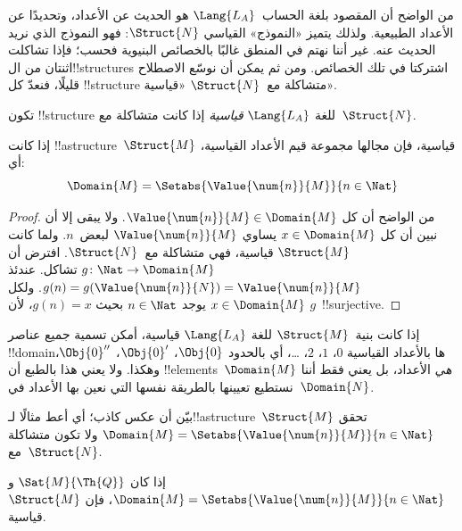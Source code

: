 \documentclass[../../../include/open-logic-section]{subfiles}
\begin{document}

من الواضح أن المقصود بلغة الحساب~$\Lang{L_A}$ هو الحديث عن الأعداد،
وتحديدًا عن الأعداد الطبيعية. ولذلك يتميز «النموذج» القياسي
$\Struct{N}$: فهو النموذج الذي نريد الحديث عنه. غير أننا نهتم في المنطق
غالبًا بالخصائص البنيوية فحسب؛ فإذا تشاكلت اثنتان من ال!!{structure}s
اشتركتا في تلك الخصائص. ومن ثم يمكن أن نوسّع الاصطلاح قليلًا، فنعدّ كل
!!{structure} متشاكلة مع~$\Struct{N}$ «قياسية».

\begin{defn}
تكون !!{structure} للغة $\Lang{L_A}$ \emph{قياسية} إذا كانت متشاكلة
مع~$\Struct{N}$.
\end{defn}

\begin{prop}
 إذا كانت !!a{structure}~$\Struct{M}$
قياسية، فإن مجالها مجموعة قيم الأعداد القياسية، أي:
\[
\Domain{M} = \Setabs{\Value{\num{n}}{M}}{n \in \Nat}
\]
\end{prop}

\begin{proof}
من الواضح أن كل $\Value{\num{n}}{M} \in \Domain{M}$. ولا يبقى إلا أن
نبين أن كل $x \in \Domain{M}$ يساوي $\Value{\num{n}}{M}$ لبعض~$n$.
ولما كانت $\Struct{M}$ قياسية، فهي متشاكلة مع~$\Struct{N}$. افترض أن
$g\colon \Nat \to \Domain{M}$ تشاكل. عندئذ
$g(n) = g(\Value{\num{n}}{N}) = \Value{\num{n}}{M}$. ولكل
$x \in \Domain{M}$ يوجد $n \in \Nat$ بحيث $g(n)=x$، لأن $g$~!!{surjective}.
\end{proof}

\begin{explain}
إذا كانت بنية~$\Struct{M}$ للغة $\Lang{L_A}$ قياسية، أمكن تسمية جميع
عناصر !!{domain}ها بالأعداد القياسية $\num{0}$، $\num{1}$، $\num{2}$،
\dots، أي بالحدود $\Obj{0}$، $\Obj{0}'$، $\Obj{0}''$، وهكذا. ولا يعني
هذا بالطبع أن !!{element}s~$\Domain{M}$ \emph{هي} الأعداد، بل يعني فقط
أننا نستطيع تعيينها بالطريقة نفسها التي نعين بها الأعداد في~$\Domain{N}$.
\end{explain}

\begin{prob}
بيّن أن عكس  كاذب؛ أي أعط
مثالًا لـ!!a{structure}~$\Struct{M}$ تحقق
$\Domain{M} = \Setabs{\Value{\num{n}}{M}}{n \in \Nat}$ ولا تكون
متشاكلة مع~$\Struct{N}$.
\end{prob}

\begin{prop}
إذا كان $\Sat{M}{\Th{Q}}$ و
$\Domain{M} = \Setabs{\Value{\num{n}}{M}}{n \in \Nat}$، فإن
$\Struct{M}$ قياسية.
\end{prop}
\end{document}

